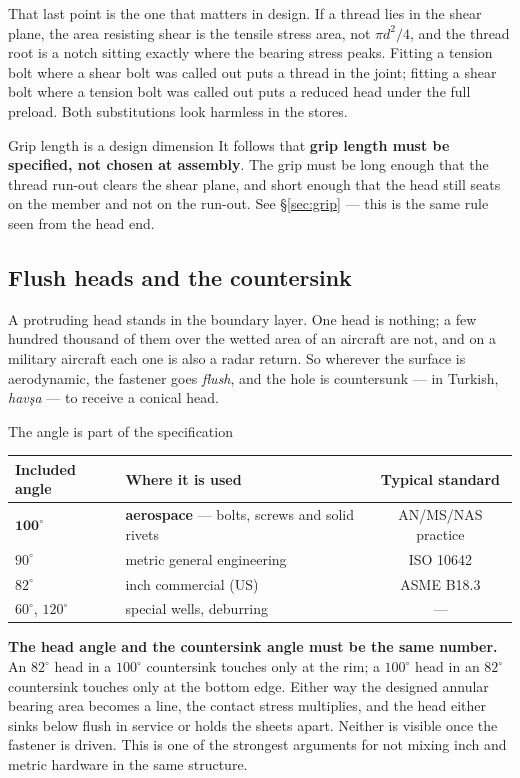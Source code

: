 \documentclass[11pt,a4paper]{article}
\begin{document}
\medskip
That last point is the one that matters in design. If a thread lies in the shear plane, the area
resisting shear is the tensile stress area, not $\pi d^2/4$, and the thread root is a notch sitting
exactly where the bearing stress peaks. Fitting a tension bolt where a shear bolt was called out
puts a thread in the joint; fitting a shear bolt where a tension bolt was called out puts a
reduced head under the full preload. Both substitutions look harmless in the stores.

\begin{keybox}{Grip length is a design dimension}
It follows that \textbf{grip length must be specified, not chosen at assembly}. The grip must be
long enough that the thread run-out clears the shear plane, and short enough that the head still
seats on the member and not on the run-out. See \S\ref{sec:grip} --- this is the same rule seen
from the head end.
\end{keybox}

\subsection{Flush heads and the countersink}

A protruding head stands in the boundary layer. One head is nothing; a few hundred thousand of
them over the wetted area of an aircraft are not, and on a military aircraft each one is also a
radar return. So wherever the surface is aerodynamic, the fastener goes \emph{flush}, and the
hole is countersunk --- in Turkish, \emph{havşa} --- to receive a conical head.

\begin{keybox}{The angle is part of the specification}
\begin{center}\small
\begin{tabular}{@{}llc@{}}
\toprule
Included angle & Where it is used & Typical standard\\
\midrule
$\mathbf{100^\circ}$ & \textbf{aerospace} --- bolts, screws and solid rivets & AN/MS/NAS practice\\
$90^\circ$ & metric general engineering & ISO 10642\\
$82^\circ$ & inch commercial (US) & ASME B18.3\\
$60^\circ$, $120^\circ$ & special wells, deburring & ---\\
\bottomrule
\end{tabular}
\end{center}

\medskip
\textbf{The head angle and the countersink angle must be the same number.} An $82^\circ$ head in a
$100^\circ$ countersink touches only at the rim; a $100^\circ$ head in an $82^\circ$ countersink
touches only at the bottom edge. Either way the designed annular bearing area becomes a line, the
contact stress multiplies, and the head either sinks below flush in service or holds the sheets
apart. Neither is visible once the fastener is driven. This is one of the strongest arguments for
not mixing inch and metric hardware in the same structure.
\end{keybox}
\end{document}
